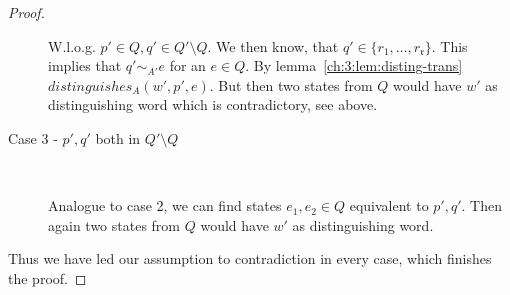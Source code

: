 \begin{proof}
\begin{description}
        W.l.o.g. $p' \in Q, q' \in Q'\setminus Q$. We then know, that $q' \in \{r_1, \ldots, r_\mathfrak{r}\}$. This implies that $q' \sim_{A'} e$ for an $e \in Q$. By lemma~\ref{ch:3:lem:disting-trans} $distinguishes_A(w', p', e)$. But then two states from $Q$ would have $w'$ as distinguishing word which is contradictory, see above. \hfill\lightning
        
        \item[Case 3 - $p',q'$ both in $Q'\setminus Q$] $ $
        
        Analogue to case 2, we can find states $e_1, e_2 \in Q$ equivalent to $p',q'$. Then again two states from $Q$ would have $w'$ as distinguishing word. \hfill\lightning
    \end{description}
    Thus we have led our assumption to contradiction in every case, which finishes the proof.
	
%    
%	
%	
%	
		

\end{proof}
